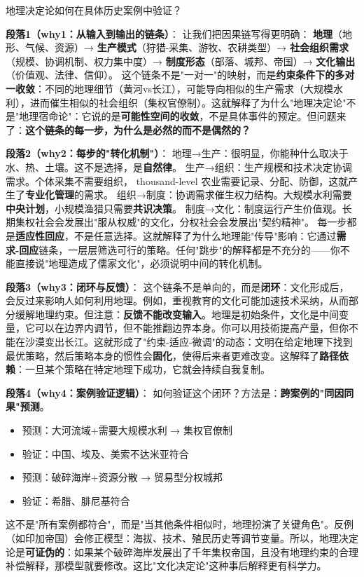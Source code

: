 \documentclass[../main.tex]{subfiles}
\begin{document}
	\begin{questionbox}
		地理决定论如何在具体历史案例中验证？
	\end{questionbox}
	
	\textbf{段落1（why1：从输入到输出的链条）}：  
	让我们把因果链写得更明确：  
	\textbf{地理}（地形、气候、资源）→ \textbf{生产模式}（狩猎-采集、游牧、农耕类型）→ \textbf{社会组织需求}（规模、协调机制、权力集中度）→ \textbf{制度形态}（部落、城邦、帝国）→ \textbf{文化输出}（价值观、法律、信仰）。  
	这个链条不是"一对一"的映射，而是\textbf{约束条件下的多对一收敛}：不同的地理细节（黄河vs长江），可能导向相似的生产需求（大规模水利），进而催生相似的社会组织（集权官僚制）。这就解释了为什么"地理决定论"不是"地理宿命论"：它说的是\textbf{可能性空间的收敛}，不是具体事件的预定。但问题来了：\textbf{这个链条的每一步，为什么是必然的而不是偶然的？}
	
	\textbf{段落2（why2：每步的"转化机制"）}：  
	地理→生产：很明显，你能种什么取决于水、热、土壤。这不是选择，是\textbf{自然律}。  
	生产→组织：生产规模和技术决定协调需求。个体采集不需要组织， thousand-level 农业需要记录、分配、防御，这就产生了\textbf{专业化管理}的需求。  
	组织→制度：协调需求催生权力结构。大规模水利需要\textbf{中央计划}，小规模渔猎只需要\textbf{共识决策}。  
	制度→文化：制度运行产生价值观。长期集权社会会发展出"服从权威"的文化，分权社会会发展出"契约精神"。  
	每一步都是\textbf{适应性回应}，不是任意选择。这就解释了为什么地理能"传导"影响：它通过\textbf{需求-回应}链条，一层层筛选可行的策略。任何"跳步"的解释都是不充分的——你不能直接说"地理造成了儒家文化"，必须说明中间的转化机制。
	
	\textbf{段落3（why3：闭环与反馈）}：  
	这个链条不是单向的，而是\textbf{闭环}：文化形成后，会反过来影响人如何利用地理。例如，重视教育的文化可能加速技术采纳，从而部分缓解地理约束。但注意：\textbf{反馈不能改变输入}。地理是初始条件，文化是中间变量，它可以在边界内调节，但不能推翻边界本身。你可以用技術提高产量，但你不能在沙漠变出长江。这就形成了"约束-适应-微调"的动态：文明在给定地理下找到最优策略，然后策略本身的惯性会\textbf{固化}，使得后来者更难改变。这解释了\textbf{路径依赖}：一旦某个策略在特定地理下成功，它就会持续自我复制。
	
	\textbf{段落4（why4：案例验证逻辑）}：  
	如何验证这个闭环？方法是：\textbf{跨案例的"同因同果"预测}。  
	\begin{itemize}
	  \item 预测：大河流域+需要大规模水利 → 集权官僚制  
	  \item 验证：中国、埃及、美索不达米亚符合  
	  \item 预测：破碎海岸+资源分散 → 贸易型分权城邦  
	  \item 验证：希腊、腓尼基符合  
	\end{itemize}
	这不是"所有案例都符合"，而是"当其他条件相似时，地理扮演了关键角色"。反例（如印加帝国）会修正模型：海拔、技术、殖民历史等调节变量。所以，地理决定论是\textbf{可证伪的}：如果某个破碎海岸发展出了千年集权帝国，且没有地理约束的合理补偿解释，那模型就要修改。这比"文化决定论"这种事后解释更有科学力。
	
\end{document}
